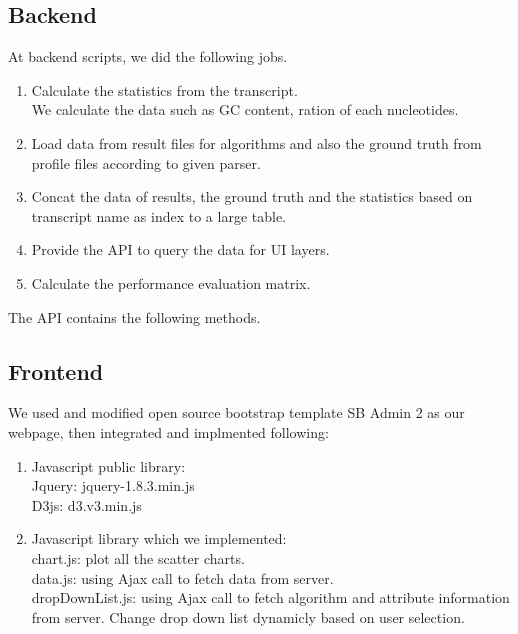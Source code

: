 \documentclass[11pt,letter]{article}
\begin{document}
\subsection {Backend}
At backend scripts, we did the following jobs.
\begin{enumerate}
\item Calculate the statistics from the transcript. \\
We calculate the data such as GC content, ration of each nucleotides.
\item Load data from result files for algorithms and also the ground truth from profile files according to given parser.
\item Concat the data of results, the ground truth and the statistics based on transcript name as index to a large table.
\item Provide the API to query the data for UI layers.
\item Calculate the performance evaluation matrix.
\end{enumerate}
The API contains the following methods.

\subsection {Frontend}
We used and modified open source bootstrap template SB Admin 2 \cite{sb_admin_2} as our webpage, then integrated and implmented following:\\
\begin{enumerate}
\item Javascript public library:\\
Jquery: jquery-1.8.3.min.js\\
D3js: d3.v3.min.js \cite{d3_scatterplot}\\
\item Javascript library which we implemented:\\
chart.js:  plot all the scatter charts.\\
data.js: using Ajax call to fetch data from server.\\
dropDownList.js: using Ajax call to fetch algorithm and attribute information from server. Change drop down list dynamicly based on user selection.\\
\end{enumerate}
\end{document}
